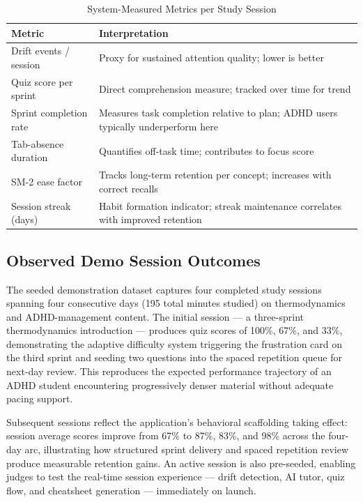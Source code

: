 \documentclass[conference]{IEEEtran}
\begin{document}
\begin{table}[htbp]
\caption{System-Measured Metrics per Study Session}
\label{tab:metrics}
\renewcommand{\arraystretch}{1.3}
\begin{tabular}{>{\raggedright}p{2.5cm}>{\raggedright\arraybackslash}p{5cm}}
\toprule
\textbf{Metric} & \textbf{Interpretation} \\
\midrule
Drift events / session & Proxy for sustained attention quality; lower is better \\
Quiz score per sprint & Direct comprehension measure; tracked over time for trend \\
Sprint completion rate & Measures task completion relative to plan; ADHD users typically underperform here \\
Tab-absence duration & Quantifies off-task time; contributes to focus score \\
SM-2 ease factor & Tracks long-term retention per concept; increases with correct recalls \\
Session streak (days) & Habit formation indicator; streak maintenance correlates with improved retention~\cite{cepeda2006distributed} \\
\bottomrule
\end{tabular}
\end{table}

\subsection{Observed Demo Session Outcomes}

The seeded demonstration dataset captures four completed study sessions spanning four consecutive days (195 total minutes studied) on thermodynamics and ADHD-management content. The initial session — a three-sprint thermodynamics introduction — produces quiz scores of 100\%, 67\%, and 33\%, demonstrating the adaptive difficulty system triggering the frustration card on the third sprint and seeding two questions into the spaced repetition queue for next-day review. This reproduces the expected performance trajectory of an ADHD student encountering progressively denser material without adequate pacing support.

Subsequent sessions reflect the application's behavioral scaffolding taking effect: session average scores improve from 67\% to 87\%, 83\%, and 98\% across the four-day arc, illustrating how structured sprint delivery and spaced repetition review produce measurable retention gains. An active session is also pre-seeded, enabling judges to test the real-time session experience — drift detection, AI tutor, quiz flow, and cheatsheet generation — immediately on launch.
\end{document}
